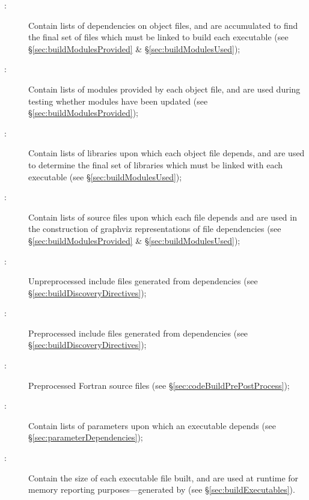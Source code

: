 \begin{description}
\item[:] Contain lists of dependencies on object files, and are accumulated to find the final set of files which must be linked to build each executable (see \S\ref{sec:buildModulesProvided} \& \S\ref{sec:buildModulesUsed});

\item[:] Contain lists of modules provided by each object file, and are used during testing whether modules have been updated (see \S\ref{sec:buildModulesProvided});

\item[:] Contain lists of libraries upon which each object file depends, and are used to determine the final set of libraries which must be linked with each executable (see \S\ref{sec:buildModulesUsed});

\item[:] Contain lists of source files upon which each file depends and are used in the construction of \gls{graphviz} representations of file dependencies (see \S\ref{sec:buildModulesProvided} \& \S\ref{sec:buildModulesUsed});

\item[:] Unpreprocessed include files generated from  dependencies (see \S\ref{sec:buildDiscoveryDirectives});

\item[:] Preprocessed include files generated from  dependencies (see \S\ref{sec:buildDiscoveryDirectives});

\item[:] Preprocessed Fortran source files (see \S\ref{sec:codeBuildPrePostProcess});

\item[:] Contain lists of parameters upon which an executable depends (see \S\ref{sec:parameterDependencies});

\item[:] Contain the size of each executable file built, and are used at runtime for memory reporting purposes---generated by  (see \S\ref{sec:buildExecutables}).
\end{description}

